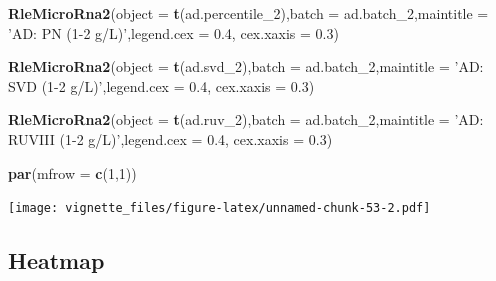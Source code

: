 \documentclass[]{book}
\newenvironment{Shaded}{\begin{snugshade}}{\end{snugshade}}
\newcommand{\KeywordTok}[1]{\textcolor[rgb]{0.13,0.29,0.53}{\textbf{#1}}}
\newcommand{\DataTypeTok}[1]{\textcolor[rgb]{0.13,0.29,0.53}{#1}}
\newcommand{\DecValTok}[1]{\textcolor[rgb]{0.00,0.00,0.81}{#1}}
\newcommand{\FloatTok}[1]{\textcolor[rgb]{0.00,0.00,0.81}{#1}}
\newcommand{\StringTok}[1]{\textcolor[rgb]{0.31,0.60,0.02}{#1}}
\newcommand{\NormalTok}[1]{#1}
\begin{document}
\begin{Shaded}
\begin{Highlighting}[]
\KeywordTok{RleMicroRna2}\NormalTok{(}\DataTypeTok{object =} \KeywordTok{t}\NormalTok{(ad.percentile_}\DecValTok{2}\NormalTok{),}\DataTypeTok{batch =}\NormalTok{ ad.batch_}\DecValTok{2}\NormalTok{,}\DataTypeTok{maintitle =} \StringTok{'AD: PN (1-2 g/L)'}\NormalTok{,}\DataTypeTok{legend.cex =} \FloatTok{0.4}\NormalTok{, }\DataTypeTok{cex.xaxis =} \FloatTok{0.3}\NormalTok{)}

\KeywordTok{RleMicroRna2}\NormalTok{(}\DataTypeTok{object =} \KeywordTok{t}\NormalTok{(ad.svd_}\DecValTok{2}\NormalTok{),}\DataTypeTok{batch =}\NormalTok{ ad.batch_}\DecValTok{2}\NormalTok{,}\DataTypeTok{maintitle =} \StringTok{'AD: SVD (1-2 g/L)'}\NormalTok{,}\DataTypeTok{legend.cex =} \FloatTok{0.4}\NormalTok{, }\DataTypeTok{cex.xaxis =} \FloatTok{0.3}\NormalTok{)}

\KeywordTok{RleMicroRna2}\NormalTok{(}\DataTypeTok{object =} \KeywordTok{t}\NormalTok{(ad.ruv_}\DecValTok{2}\NormalTok{),}\DataTypeTok{batch =}\NormalTok{ ad.batch_}\DecValTok{2}\NormalTok{,}\DataTypeTok{maintitle =} \StringTok{'AD: RUVIII (1-2 g/L)'}\NormalTok{,}\DataTypeTok{legend.cex =} \FloatTok{0.4}\NormalTok{, }\DataTypeTok{cex.xaxis =} \FloatTok{0.3}\NormalTok{)}

\KeywordTok{par}\NormalTok{(}\DataTypeTok{mfrow =} \KeywordTok{c}\NormalTok{(}\DecValTok{1}\NormalTok{,}\DecValTok{1}\NormalTok{))}
\end{Highlighting}
\end{Shaded}

\texttt{[image: vignette\_files/figure-latex/unnamed-chunk-53-2.pdf]}

\subsection{Heatmap}\label{heatmap-1}
\end{document}
